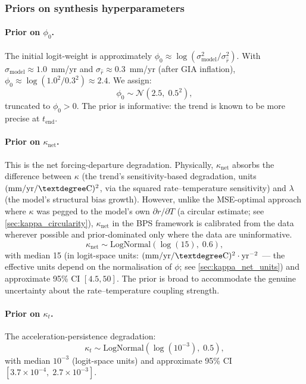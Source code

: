 \documentclass[11pt]{article}
\newcommand{\tend}{t_{\mathrm{end}}}
\newcommand{\sigr}{\sigma_{\hat{r}}}
\newcommand{\sigmodel}{\sigma_{\mathrm{model}}}
\begin{document}
\subsubsection{Priors on synthesis hyperparameters}
\label{sec:psi_priors}

\paragraph{Prior on $\phi_0$.}  The initial logit-weight is approximately $\phi_0 \approx \log(\sigmodel^2 / \sigr^2)$.  With $\sigmodel \approx 1.0$~mm/yr and $\sigr \approx 0.3$~mm/yr (after GIA inflation), $\phi_0 \approx \log(1.0^2 / 0.3^2) \approx 2.4$.  We assign:
\begin{equation}
  \phi_0 \sim \mathcal{N}(2.5,\; 0.5^2),
  \label{eq:phi0_prior}
\end{equation}
truncated to $\phi_0 > 0$.  The prior is informative: the trend is known to be more precise at $\tend$.

\paragraph{Prior on $\kappa_{\mathrm{net}}$.}  This is the net forcing-departure degradation.  Physically, $\kappa_{\mathrm{net}}$ absorbs the difference between $\kappa$ (the trend's sensitivity-based degradation, units $({\rm mm/yr/\textdegree C})^2$, via the squared rate--temperature sensitivity) and $\lambda$ (the model's structural bias growth).  However, unlike the MSE-optimal approach where $\kappa$ was pegged to the model's own $\partial r / \partial T$ (a circular estimate; see \cref{sec:kappa_circularity}), $\kappa_{\mathrm{net}}$ in the BPS framework is calibrated from the data wherever possible and prior-dominated only where the data are uninformative.
\begin{equation}
  \kappa_{\mathrm{net}} \sim \mathrm{LogNormal}(\log(15),\; 0.6),
  \label{eq:kappa_net_prior}
\end{equation}
with median 15 (in logit-space units: $({\rm mm/yr/\textdegree C})^2 \cdot {\rm yr}^{-2}$ --- the effective units depend on the normalisation of $\phi$; see \cref{sec:kappa_net_units}) and approximate 95\% CI $[4.5, 50]$.  The prior is broad to accommodate the genuine uncertainty about the rate--temperature coupling strength.

\paragraph{Prior on $\kappa_t$.}  The acceleration-persistence degradation:
\begin{equation}
  \kappa_t \sim \mathrm{LogNormal}(\log(10^{-3}),\; 0.5),
  \label{eq:kappa_t_prior}
\end{equation}
with median $10^{-3}$ (logit-space units) and approximate 95\% CI $[3.7 \times 10^{-4},\; 2.7 \times 10^{-3}]$.
\end{document}
